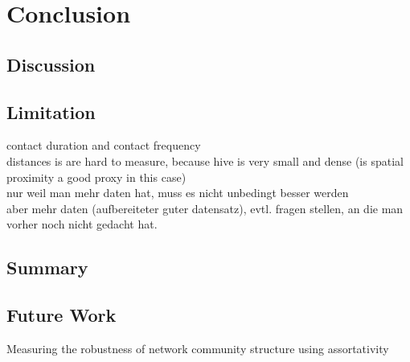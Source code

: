 \chapter{Conclusion}

\section{Discussion}

\section{Limitation}
contact duration and contact frequency\\
distances is are hard to measure, because hive is very small and dense (is spatial proximity a good proxy in this case)\\

nur weil man mehr daten hat, muss es nicht unbedingt besser werden\\
aber mehr daten (aufbereiteter guter datensatz), evtl. fragen stellen, an die man vorher noch nicht gedacht  hat.\\

\section{Summary}

\section{Future Work}

Measuring the robustness of network community structure using assortativity~\cite{shizuka2016measuring}
